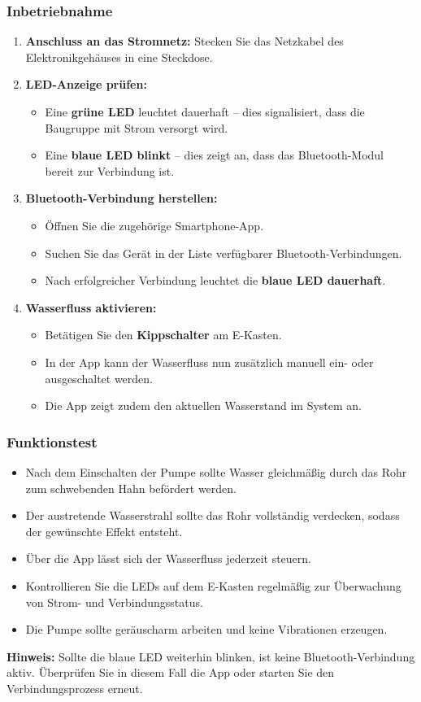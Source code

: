 \subsubsection{Inbetriebnahme}
\begin{enumerate}
	\item \textbf{Anschluss an das Stromnetz:} Stecken Sie das Netzkabel des Elektronikgehäuses in eine Steckdose.
	\item \textbf{LED-Anzeige prüfen:}
	\begin{itemize}
		\item Eine \textbf{grüne LED} leuchtet dauerhaft – dies signalisiert, dass die Baugruppe mit Strom versorgt wird.
		\item Eine \textbf{blaue LED blinkt} – dies zeigt an, dass das Bluetooth-Modul bereit zur Verbindung ist.
	\end{itemize}
	\item \textbf{Bluetooth-Verbindung herstellen:}
	\begin{itemize}
		\item Öffnen Sie die zugehörige Smartphone-App.
		\item Suchen Sie das Gerät in der Liste verfügbarer Bluetooth-Verbindungen.
		\item Nach erfolgreicher Verbindung leuchtet die \textbf{blaue LED dauerhaft}.
	\end{itemize}
	\item \textbf{Wasserfluss aktivieren:}
	\begin{itemize}
		\item Betätigen Sie den \textbf{Kippschalter} am E-Kasten.
		\item In der App kann der Wasserfluss nun zusätzlich manuell ein- oder ausgeschaltet werden.
		\item Die App zeigt zudem den aktuellen Wasserstand im System an.
	\end{itemize}
\end{enumerate}

\subsubsection{Funktionstest}
\begin{itemize}
	\item Nach dem Einschalten der Pumpe sollte Wasser gleichmäßig durch das Rohr zum schwebenden Hahn befördert werden.
	\item Der austretende Wasserstrahl sollte das Rohr vollständig verdecken, sodass der gewünschte Effekt entsteht.
	\item Über die App lässt sich der Wasserfluss jederzeit steuern.
	\item Kontrollieren Sie die LEDs auf dem E-Kasten regelmäßig zur Überwachung von Strom- und Verbindungsstatus.
	\item Die Pumpe sollte geräuscharm arbeiten und keine Vibrationen erzeugen.
\end{itemize}

\textbf{Hinweis:} Sollte die blaue LED weiterhin blinken, ist keine Bluetooth-Verbindung aktiv. Überprüfen Sie in diesem Fall die App oder starten Sie den Verbindungsprozess erneut.